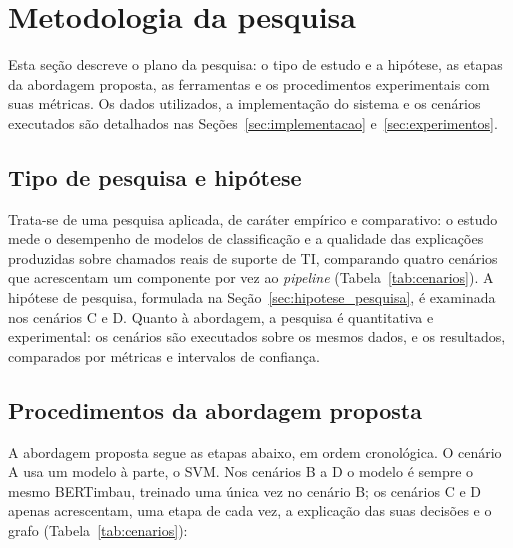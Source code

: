 \documentclass[
    12pt,                %
    openright,           %
    oneside,             %
    a4paper,             %
    english,             %
    brazil               %
]{abntex2}
\begin{document}
\section{Metodologia da pesquisa}
\label{sec:metodologia_pesquisa}

Esta seção descreve o plano da pesquisa: o tipo de estudo e a hipótese, as etapas da abordagem proposta, as ferramentas e os procedimentos experimentais com suas métricas. Os dados utilizados, a implementação do sistema e os cenários executados são detalhados nas Seções~\ref{sec:implementacao} e~\ref{sec:experimentos}.

\subsection{Tipo de pesquisa e hipótese}
\label{sec:tipo_pesquisa}
Trata-se de uma pesquisa aplicada, de caráter empírico e comparativo: o estudo mede o desempenho 
de modelos de classificação e a qualidade das explicações produzidas sobre chamados reais de suporte de TI, 
comparando quatro cenários que acrescentam um componente por vez ao \textit{pipeline} (Tabela~\ref{tab:cenarios}). 
A hipótese de pesquisa, formulada na Seção~\ref{sec:hipotese_pesquisa}, é examinada nos cenários C e D. Quanto à abordagem, a pesquisa é quantitativa e experimental: os cenários são executados sobre os mesmos dados, e os resultados, comparados por métricas e intervalos de confiança.

\subsection{Procedimentos da abordagem proposta}
\label{sec:procedimentos}

A abordagem proposta segue as etapas abaixo, em ordem cronológica. O cenário A usa um modelo à parte, o SVM. Nos cenários B a D o modelo é sempre o mesmo BERTimbau, treinado uma única vez no cenário B; os cenários C e D apenas acrescentam, uma etapa de cada vez, a explicação das suas decisões e o grafo (Tabela~\ref{tab:cenarios}):
\end{document}
